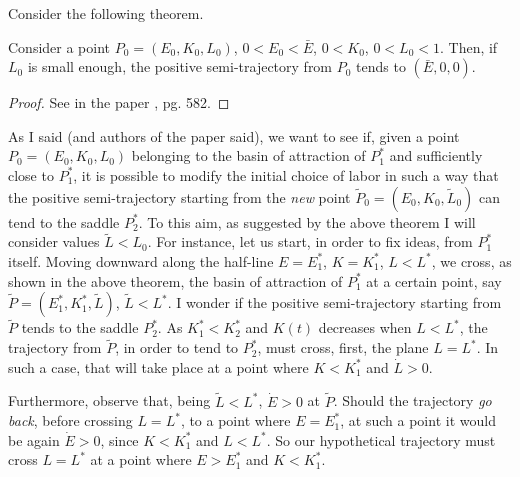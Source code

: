 Consider the following theorem.
\begin{thm} \label{thm:6_attracting_limit_pnt}
	Consider a point $P_0 = (E_0,K_0,L_0)$, $0<E_0<\bar{E}$, $0<K_0$, $0<L_0<1$. Then, if $L_0$ is small enough, the positive semi-trajectory from $P_0$ tends to $(\bar{E},0,0)$.
\end{thm}
\begin{proof}
	See in the paper \cite{antoci_poverty_2011}, pg. 582.
\end{proof}
As I said (and authors of the paper said), we want to see if, given a point $P_0 = (E_0,K_0,L_0)$ belonging to the basin of attraction of $P_1^*$ and sufficiently close to $P_1^*$, it is possible to modify the initial choice of labor in such a way that the positive semi-trajectory starting from the \textit{new} point $\widetilde{P}_0 = (E_0,K_0,\widetilde{L}_0)$ can tend to the saddle $P_2^*$. To this aim, as suggested by the above theorem I will consider values $\widetilde{L}<L_0$. For instance, let us start, in order to fix ideas, from $P_1^*$ itself. Moving downward along the half-line $E = E_1^*$, $K = K_1^*$, $L < L^*$, we cross, as shown in the above theorem, the basin of attraction of $P_1^*$ at a certain point, say $\widetilde{P}=(E_1^*,K_1^*,\widetilde{L})$, $\widetilde{L}<L^*$. I wonder if the positive
semi-trajectory starting from $\widetilde{P}$ tends to the saddle $P_2^*$. As $K_1^*<K_2^*$ and $K(t)$ decreases when $L<L^*$, the trajectory from $\widetilde{P}$, in order to tend to $P_2^*$, must cross, first, the plane $L = L^*$. In such a case, that will take place at a point where $K<K_1^*$ and $\dot{L}>0$.

Furthermore, observe that, being $\widetilde{L}<L^*$, $\dot{E}>0$ at $\widetilde{P}$. Should the trajectory \textit{go back}, before crossing $L = L^*$, to a point where $E= E_1^*$, at such a point it would be again $\dot{E}>0$, since $K<K_1^*$ and $L<L^*$. So our hypothetical trajectory must cross $L = L^*$ at a point where $E>E_1^*$
and $K<K_1^*$. 

